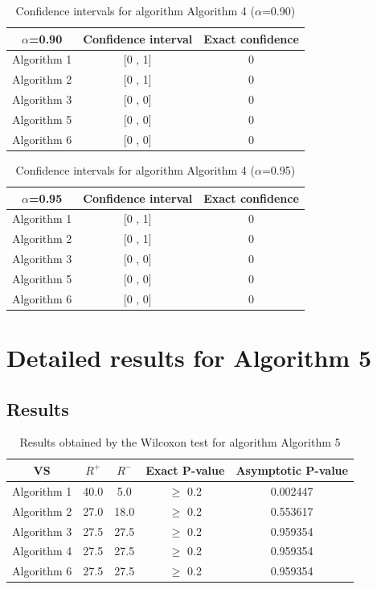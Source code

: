 \documentclass[a4paper,10pt]{article}
\begin{document}
\begin{table}[!htp]
\centering\small
\begin{tabular}{
|c|c|c|}
\hline
 $\alpha$=0.90 & Confidence interval & Exact confidence \\ \hline 
Algorithm 1 & [0 , 1] & 0\\ \hline 
Algorithm 2 & [0 , 1] & 0\\ \hline 
Algorithm 3 & [0 , 0] & 0\\ \hline 
Algorithm 5 & [0 , 0] & 0\\ \hline 
Algorithm 6 & [0 , 0] & 0\\ \hline 

\end{tabular}
\caption{Confidence intervals for algorithm Algorithm 4 ($\alpha$=0.90)}
\end{table}
\begin{table}[!htp]
\centering\small
\begin{tabular}{
|c|c|c|}
\hline
 $\alpha$=0.95 & Confidence interval & Exact confidence \\ \hline 
Algorithm 1 & [0 , 1] & 0\\ \hline 
Algorithm 2 & [0 , 1] & 0\\ \hline 
Algorithm 3 & [0 , 0] & 0\\ \hline 
Algorithm 5 & [0 , 0] & 0\\ \hline 
Algorithm 6 & [0 , 0] & 0\\ \hline 

\end{tabular}
\caption{Confidence intervals for algorithm Algorithm 4 ($\alpha$=0.95)}
\end{table}

 \clearpage 


\section{Detailed results for Algorithm 5}


\subsection{Results}

\begin{table}[!htp]
\centering\small
\begin{tabular}{
|c|c|c|c|c|}
\hline
 VS & $R^{+}$ & $R^{-}$ & Exact P-value & Asymptotic P-value \\ \hline 
Algorithm 1 & 40.0 & 5.0 & $\geq$ 0.2 & 0.002447\\ \hline 
Algorithm 2 & 27.0 & 18.0 & $\geq$ 0.2 & 0.553617\\ \hline 
Algorithm 3 & 27.5 & 27.5 & $\geq$ 0.2 & 0.959354\\ \hline 
Algorithm 4 & 27.5 & 27.5 & $\geq$ 0.2 & 0.959354\\ \hline 
Algorithm 6 & 27.5 & 27.5 & $\geq$ 0.2 & 0.959354\\ \hline 

\end{tabular}
\caption{Results obtained by the Wilcoxon test for algorithm Algorithm 5}
\end{table}
\end{document}
